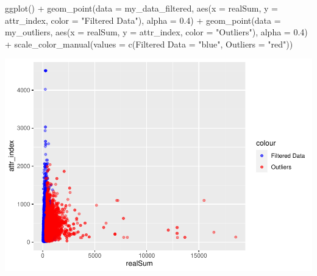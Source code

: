 \documentclass[
]{article}
\newenvironment{Shaded}{\begin{snugshade}}{\end{snugshade}}
\newcommand{\AttributeTok}[1]{\textcolor[rgb]{0.77,0.63,0.00}{#1}}
\newcommand{\FloatTok}[1]{\textcolor[rgb]{0.00,0.00,0.81}{#1}}
\newcommand{\FunctionTok}[1]{\textcolor[rgb]{0.00,0.00,0.00}{#1}}
\newcommand{\NormalTok}[1]{#1}
\newcommand{\OtherTok}[1]{\textcolor[rgb]{0.56,0.35,0.01}{#1}}
\newcommand{\SpecialCharTok}[1]{\textcolor[rgb]{0.00,0.00,0.00}{#1}}
\newcommand{\StringTok}[1]{\textcolor[rgb]{0.31,0.60,0.02}{#1}}
\begin{document}
\begin{Shaded}
\begin{Highlighting}[]
\FunctionTok{ggplot}\NormalTok{() }\SpecialCharTok{+} \FunctionTok{geom\_point}\NormalTok{(}\AttributeTok{data =}\NormalTok{ my\_data\_filtered, }\FunctionTok{aes}\NormalTok{(}\AttributeTok{x =}\NormalTok{ realSum,}
    \AttributeTok{y =}\NormalTok{ attr\_index, }\AttributeTok{color =} \StringTok{"Filtered Data"}\NormalTok{), }\AttributeTok{alpha =} \FloatTok{0.4}\NormalTok{) }\SpecialCharTok{+}
    \FunctionTok{geom\_point}\NormalTok{(}\AttributeTok{data =}\NormalTok{ my\_outliers, }\FunctionTok{aes}\NormalTok{(}\AttributeTok{x =}\NormalTok{ realSum, }\AttributeTok{y =}\NormalTok{ attr\_index,}
        \AttributeTok{color =} \StringTok{"Outliers"}\NormalTok{), }\AttributeTok{alpha =} \FloatTok{0.4}\NormalTok{) }\SpecialCharTok{+} \FunctionTok{scale\_color\_manual}\NormalTok{(}\AttributeTok{values =} \FunctionTok{c}\NormalTok{(}\StringTok{\textasciigrave{}}\AttributeTok{Filtered Data}\StringTok{\textasciigrave{}} \OtherTok{=} \StringTok{"blue"}\NormalTok{,}
    \AttributeTok{Outliers =} \StringTok{"red"}\NormalTok{))}
\end{Highlighting}
\end{Shaded}

\includegraphics{Project_files/figure-latex/unnamed-chunk-17-1.pdf}
\end{document}
